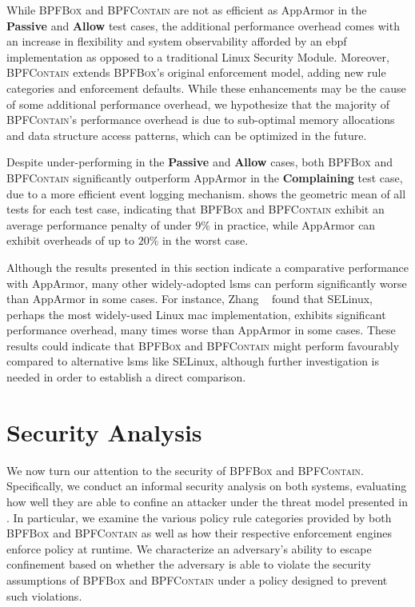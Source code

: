 \documentclass[
  fontsize=12pt,
  titlepage=firstiscover,
  paper=letter,
oneside,
  cleardoublepage=plain,
  parskip=half-,
  DIV=10,
  parindent,
  appendixprefix,
  chapterprefix,
  listof=totoc,
]{scrbook}
\newcommand{\bpfbox}{\textsc{BPFBox}}
\newcommand{\bpfcontain}{\textsc{BPFContain}}
\begin{document}
While \bpfbox{} and \bpfcontain{} are not as efficient as AppArmor in the \textbf{Passive}
and \textbf{Allow} test cases, the additional performance overhead comes with an increase
in flexibility and system observability afforded by an \gls{ebpf} implementation as
opposed to a traditional Linux Security Module.  Moreover, \bpfcontain{} extends
\bpfbox{}'s original enforcement model, adding new rule categories and enforcement
defaults. While these enhancements may be the cause of some additional performance
overhead, we hypothesize that the majority of \bpfcontain{}'s performance overhead is due to
sub-optimal memory allocations and data structure access patterns, which can be optimized
in the future.

Despite under-performing in the \textbf{Passive} and \textbf{Allow} cases, both \bpfbox{}
and \bpfcontain{} significantly outperform AppArmor in the \textbf{Complaining} test case,
due to a more efficient event logging mechanism.  shows the
geometric mean of all tests for each test case, indicating that \bpfbox{} and
\bpfcontain{} exhibit an average performance penalty of under $9\%$ in practice, while
AppArmor can exhibit overheads of up to $20\%$ in the worst case.

Although the results presented in this section indicate a comparative performance with
AppArmor, many other widely-adopted \glspl{lsm} can perform significantly worse than
AppArmor in some cases. For instance, Zhang \etal~\cite{zhang2021_lsm_file_overhead} found
that SELinux, perhaps the most widely-used Linux \gls{mac} implementation, exhibits
significant performance overhead, many times worse than AppArmor in some cases. These
results could indicate that \bpfbox{} and \bpfcontain{} might perform favourably compared
to alternative \glspl{lsm} like SELinux, although further investigation is needed in order
to establish a direct comparison.

\section{Security Analysis}\label{s:eval-security}

We now turn our attention to the security of \bpfbox{} and \bpfcontain. Specifically, we
conduct an informal security analysis on both systems, evaluating how well they are able
to confine an attacker under the threat model presented in . In
particular, we examine the various policy rule categories provided by both \bpfbox{} and
\bpfcontain{} as well as how their respective enforcement engines enforce policy at
runtime. We characterize an adversary's ability to escape confinement based on whether the
adversary is able to violate the security assumptions of \bpfbox{} and \bpfcontain{} under
a policy designed to prevent such violations.
\end{document}
